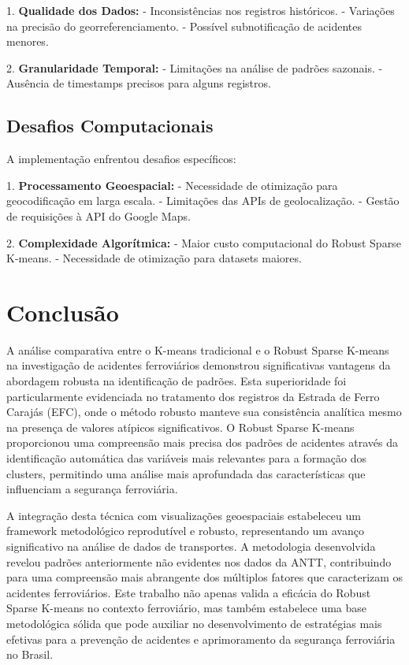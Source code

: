 \documentclass[conference]{IEEEtran}
\begin{document}
1. \textbf{Qualidade dos Dados:}
   - Inconsistências nos registros históricos.
   - Variações na precisão do georreferenciamento.
   - Possível subnotificação de acidentes menores.

2. \textbf{Granularidade Temporal:}
   - Limitações na análise de padrões sazonais.
   - Ausência de timestamps precisos para alguns registros.

\subsection{Desafios Computacionais}
A implementação enfrentou desafios específicos:

1. \textbf{Processamento Geoespacial:}
   - Necessidade de otimização para geocodificação em larga escala.
   - Limitações das APIs de geolocalização.
   - Gestão de requisições à API do Google Maps.

2. \textbf{Complexidade Algorítmica:}
   - Maior custo computacional do Robust Sparse K-means.
   - Necessidade de otimização para datasets maiores.

\section{Conclusão}

A análise comparativa entre o K-means tradicional e o Robust Sparse K-means na investigação de acidentes ferroviários demonstrou significativas vantagens da abordagem robusta na identificação de padrões. Esta superioridade foi particularmente evidenciada no tratamento dos registros da Estrada de Ferro Carajás (EFC), onde o método robusto manteve sua consistência analítica mesmo na presença de valores atípicos significativos. O Robust Sparse K-means proporcionou uma compreensão mais precisa dos padrões de acidentes através da identificação automática das variáveis mais relevantes para a formação dos clusters, permitindo uma análise mais aprofundada das características que influenciam a segurança ferroviária.

A integração desta técnica com visualizações geoespaciais estabeleceu um framework metodológico reprodutível e robusto, representando um avanço significativo na análise de dados de transportes. A metodologia desenvolvida revelou padrões anteriormente não evidentes nos dados da ANTT, contribuindo para uma compreensão mais abrangente dos múltiplos fatores que caracterizam os acidentes ferroviários. Este trabalho não apenas valida a eficácia do Robust Sparse K-means no contexto ferroviário, mas também estabelece uma base metodológica sólida que pode auxiliar no desenvolvimento de estratégias mais efetivas para a prevenção de acidentes e aprimoramento da segurança ferroviária no Brasil.
\end{document}
